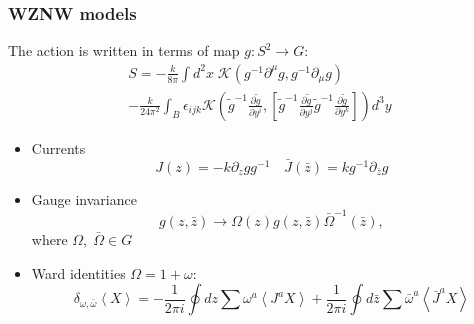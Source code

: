 \documentclass[pdftex]{beamer}
\theoremstyle{definition} \newtheorem{Def}{Definition}
\begin{document}
\begin{frame}
  \frametitle{WZNW models}
  The action is written in terms of map $g:S^{2}\to G$:
  \begin{multline*}
    S=-\frac{k}{8\pi}\int d^2x\; \mathcal{K} (g^{-1}\partial^{\mu}g, g^{-1} \partial_{\mu}g)  
    \\
    - \frac{k }{24\pi^{2}} \int_{B}\epsilon_{ijk} \mathcal{K}\left(
      \tilde g^{-1}\frac{\partial \tilde g}{\partial y^i},\left[
      \tilde g^{-1}\frac{\partial \tilde g}{\partial y^j}
      \tilde g^{-1}\frac{\partial \tilde g}{\partial y^k}\right]\right) d^3y
  \end{multline*}
  \begin{itemize}
  \item   Currents 
    \begin{equation*}
      J(z)= -k \partial_zg g^{-1}\quad \bar J(\bar z)=k g^{-1}\partial_{\bar z}g
    \end{equation*}

  \item Gauge invariance
    \begin{equation*}
      g(z,\bar z)\to \Omega(z)g(z,\bar z)\bar \Omega^{-1}(\bar z),
    \end{equation*}
    where $\Omega,\;\bar \Omega \in G$

  \item Ward identities $\Omega=1+\omega$:
    \begin{equation*}
      \label{eq:87}
      \delta_{\omega,\bar \omega}\left< X \right>=-\frac{1}{2\pi i}\oint dz \sum\omega^a \left< J^a X\right>+
      \frac{1}{2\pi i} \oint d\bar z \sum \bar \omega^a \left< \bar J^a X\right>
    \end{equation*}
  \end{itemize}
\end{frame}
\end{document}
